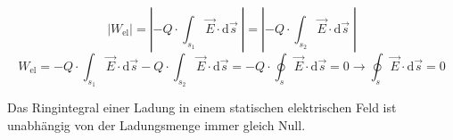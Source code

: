 \begin{frame}
{	%
}%
\b{
	\begin{equation*}
		\left| W_\mathrm{el} \right| = \left| -Q \cdot \int_{s_\mathrm{1}} \vec{E} \cdot \mathrm{d}\vec{s}\; \right| = \left| -Q \cdot \int_{s_\mathrm{2}}\vec{E} \cdot \mathrm{d}\vec{s}\; \right| %
	\end{equation*}
    \begin{equation*}
	W_\mathrm{el} = - Q \cdot \int_{s_\mathrm{1}} \vec{E} \cdot \mathrm{d}\vec{s} -Q \cdot \int_{s_\mathrm{2}}\vec{E} \cdot \mathrm{d}\vec{s} = - Q \cdot \oint_{s}\vec{E} \cdot \mathrm{d}\vec{s} = 0
	\rightarrow \oint_{s}\vec{E} \cdot \mathrm{d}\vec{s} = 0
	\end{equation*}
}


\end{frame}
\begin{frame}
	\begin{Merksatz}

	Das Ringintegral einer Ladung in einem statischen elektrischen Feld ist unabhängig von der Ladungsmenge immer gleich Null.
	
	\end{Merksatz}
\end{frame}




